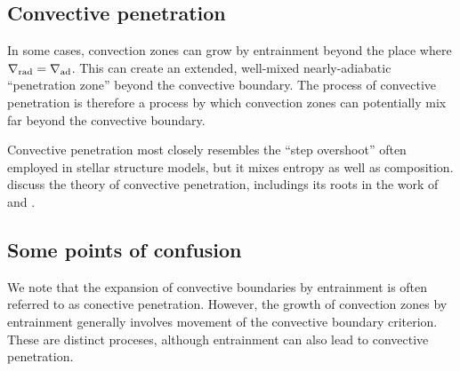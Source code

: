 \subsection{Convective penetration}
In some cases, convection zones can grow by entrainment beyond the place where $\nabla_{\rm{rad}} = \nabla_{\rm{ad}}$.
This can create an extended, well-mixed nearly-adiabatic ``penetration zone'' beyond the convective boundary.
The process of convective penetration is therefore a process by which convection zones can potentially mix far beyond the convective boundary.

Convective penetration most closely resembles the ``step overshoot'' often employed in stellar structure models, but it mixes entropy as well as composition.
\citet{anders_etal_2021} discuss the theory of convective penetration, includings its roots in the work of \citet{roxburgh1978, roxburgh1989} and \citet{zahn1991}.


\subsection{Some points of confusion}
We note that the expansion of convective boundaries by entrainment is often referred to as conective penetration.
However, the growth of convection zones by entrainment generally involves movement of the convective boundary criterion.
These are distinct proceses, although entrainment can also lead to convective penetration.
